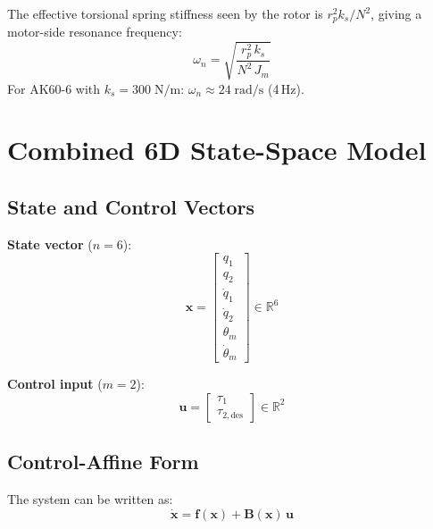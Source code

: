 \documentclass[11pt, a4paper]{article}
\newcommand{\bu}{\bm{u}}
\newcommand{\bx}{\bm{x}}
\newcommand{\bB}{\bm{B}}
\newcommand{\R}{\mathbb{R}}
\begin{document}
The effective torsional spring stiffness seen by the rotor is
$r_p^2 k_s / N^2$, giving a motor-side resonance frequency:
\begin{equation}
\omega_n = \sqrt{\frac{r_p^2\,k_s}{N^2\,J_m}}
\end{equation}
For AK60-6 with $k_s = 300\;\text{N/m}$: $\omega_n \approx 24\;\text{rad/s}$ (4\,Hz).


\section{Combined 6D State-Space Model}
\label{sec:statespace}

\subsection{State and Control Vectors}

\begin{mdframed}
\textbf{State vector} ($n = 6$):
\begin{equation}
\label{eq:state}
\bx = \begin{bmatrix} q_1 \\ q_2 \\ \dot{q}_1 \\ \dot{q}_2 \\ \theta_m \\ \dot{\theta}_m \end{bmatrix}
\in \R^6
\end{equation}

\textbf{Control input} ($m = 2$):
\begin{equation}
\label{eq:control}
\bu = \begin{bmatrix} \tau_1 \\ \tau_{2,\text{des}} \end{bmatrix}
\in \R^2
\end{equation}
\end{mdframed}

\subsection{Control-Affine Form}

The system can be written as:
\begin{equation}
\label{eq:xdot}
\boxed{\dot{\bx} = \bm{f}(\bx) + \bB(\bx)\,\bu}
\end{equation}
\end{document}
